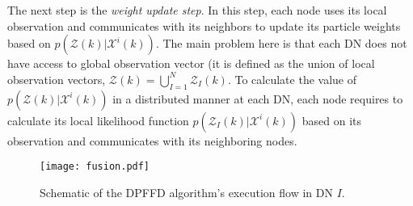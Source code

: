 \documentclass[10pt,twocolumn,twoside]{IEEEtran}
\begin{document}
The next step is the \emph{weight update step}. In this step, each
node uses its local observation and communicates with its neighbors
to update its particle weights based on $p\left(\mathcal{Z}(k)|\mathcal{X}^{i}\left(k\right)\right)$.
The main problem here is that each DN does not have access to global
observation vector (it is defined as the union of local observation
vectors, $\mathcal{Z}(k)=\bigcup_{I=1}^{N}\mathcal{Z}_{I}(k)$.
To calculate the value of $p\left(\mathcal{Z}(k)|\mathcal{X}^{i}\left(k\right)\right)$
in a distributed manner at each DN, each node requires to calculate
its local likelihood function $p\left(\mathcal{Z}_{I}(k)|\mathcal{X}^{i}\left(k\right)\right)$
based on its observation and communicates with its neighboring nodes.

\begin{figure}
\centering
\texttt{[image: fusion.pdf]}
\caption{Schematic of the DPFFD algorithm's execution flow in DN $I$. \label{fig:Block-diagram-of}}
\end{figure}
\end{document}
